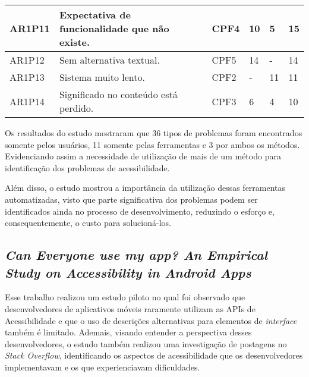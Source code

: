 \begin{table}[htb]
\begin{center}
\begin{tabular}{p{1.2cm}|p{8.7cm}|p{1.4cm}|p{0.6cm}|p{0.6cm}|p{0.7cm}}
      \hline
      AR1P11          & Expectativa de funcionalidade que não existe.                            & CPF4               & 10           & 5            & 15             \\
      \hline
      AR1P12          & Sem alternativa textual.                                                 & CPF5               & 14           & -            & 14             \\
      \hline
      AR1P13          & Sistema muito lento.                                                     & CPF2               & -            & 11           & 11             \\
      \hline
      AR1P14          & Significado no conteúdo está perdido.                                    & CPF3               & 6            & 4            & 10             \\
    \end{tabular}
  \end{center}
\end{table}

Os resultados do estudo mostraram que 36 tipos de problemas foram encontrados somente pelos usuários, 11 somente pelas ferramentas
e 3 por ambos os métodos. Evidenciando assim a necessidade de utilização de mais de um método para identificação dos problemas de
acessibilidade.

Além disso, o estudo mostrou a importância da utilização dessas ferramentas automatizadas, visto que parte significativa dos problemas
podem ser identificados ainda no processo de desenvolvimento, reduzindo o esforço e, consequentemente, o custo para solucioná-los.

\subsection{\emph{Can Everyone use my app? An Empirical Study on Accessibility in Android Apps}}

Esse trabalho realizou um estudo piloto no qual foi observado que desenvolvedores de aplicativos móveis raramente utilizam as APIs de Acessibilidade e que o uso de descrições alternativas para elementos de \emph{interface} também é limitado.
Ademais, visando entender a perspectiva desses desenvolvedores, o estudo também realizou uma investigação de postagens no \emph{Stack Overflow}, identificando os aspectos de acessibilidade que os desenvolvedores implementavam e os que experienciavam dificuldades.

